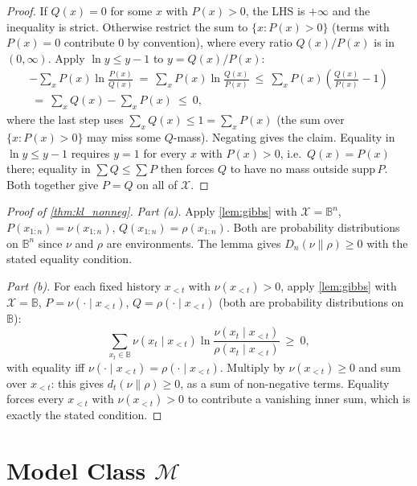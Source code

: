 \documentclass[fontsize=11pt, parskip=half]{scrartcl}
\newcommand{\Mc}{\mathcal{M}}
\begin{document}
\begin{proof}
If $Q(x) = 0$ for some $x$ with $P(x) > 0$, the LHS is $+\infty$ and the inequality is strict. Otherwise restrict the sum to $\{x : P(x) > 0\}$ (terms with $P(x) = 0$ contribute $0$ by convention), where every ratio $Q(x)/P(x)$ is in $(0, \infty)$. Apply $\ln y \leq y - 1$ to $y = Q(x)/P(x)$:
\begin{align*}
  - \sum_x P(x) \ln \frac{P(x)}{Q(x)}
  ~=~ \sum_x P(x) \ln \frac{Q(x)}{P(x)}
  ~\leq~ \sum_x P(x) \left(\frac{Q(x)}{P(x)} - 1\right) \\
  ~=~ \sum_x Q(x) - \sum_x P(x) ~\leq~ 0,
\end{align*}
where the last step uses $\sum_x Q(x) \leq 1 = \sum_x P(x)$ (the sum over $\{x : P(x) > 0\}$ may miss some $Q$-mass). Negating gives the claim. Equality in $\ln y \leq y - 1$ requires $y = 1$ for every $x$ with $P(x) > 0$, i.e.\ $Q(x) = P(x)$ there; equality in $\sum Q \leq \sum P$ then forces $Q$ to have no mass outside $\mathrm{supp}\,P$. Both together give $P = Q$ on all of $\mathcal{X}$.
\end{proof}

\begin{proof}[Proof of \cref{thm:kl_nonneg}]
\textit{Part (a).} Apply \cref{lem:gibbs} with $\mathcal{X} = \mathbb{B}^n$, $P(x_{1:n}) = \nu(x_{1:n})$, $Q(x_{1:n}) = \rho(x_{1:n})$. Both are probability distributions on $\mathbb{B}^n$ since $\nu$ and $\rho$ are environments. The lemma gives $D_n(\nu \parallel \rho) \geq 0$ with the stated equality condition.

\textit{Part (b).} For each fixed history $x_{<t}$ with $\nu(x_{<t}) > 0$, apply \cref{lem:gibbs} with $\mathcal{X} = \mathbb{B}$, $P = \nu(\cdot \mid x_{<t})$, $Q = \rho(\cdot \mid x_{<t})$ (both are probability distributions on $\mathbb{B}$):
\[
  \sum_{x_t \in \mathbb{B}} \nu(x_t \mid x_{<t}) \ln \frac{\nu(x_t \mid x_{<t})}{\rho(x_t \mid x_{<t})} ~\geq~ 0,
\]
with equality iff $\nu(\cdot \mid x_{<t}) = \rho(\cdot \mid x_{<t})$. Multiply by $\nu(x_{<t}) \geq 0$ and sum over $x_{<t}$: this gives $d_t(\nu \parallel \rho) \geq 0$, as a sum of non-negative terms. Equality forces every $x_{<t}$ with $\nu(x_{<t}) > 0$ to contribute a vanishing inner sum, which is exactly the stated condition.
\end{proof}


\section{Model Class $\Mc$}\label{app:model_class}
\end{document}

